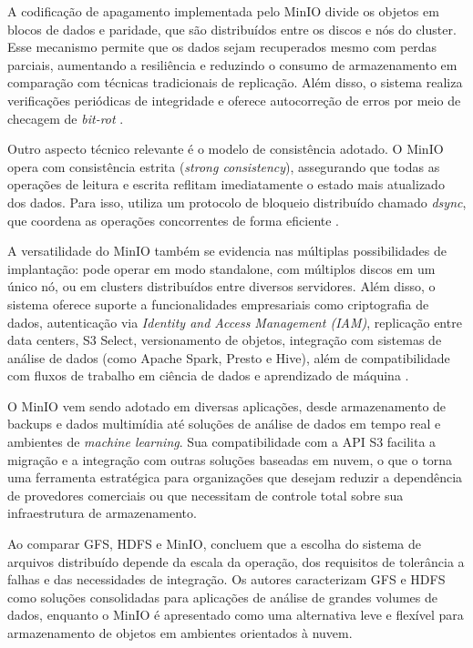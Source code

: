 A codificação de apagamento implementada pelo MinIO divide os objetos em blocos de dados e paridade, que são distribuídos entre os discos e nós do cluster. Esse mecanismo permite que os dados sejam recuperados mesmo com perdas parciais, aumentando a resiliência e reduzindo o consumo de armazenamento em comparação com técnicas tradicionais de replicação. Além disso, o sistema realiza verificações periódicas de integridade e oferece autocorreção de erros por meio de checagem de \textit{bit-rot} \cite{minio_doc}.

Outro aspecto técnico relevante é o modelo de consistência adotado. O MinIO opera com consistência estrita (\textit{strong consistency}), assegurando que todas as operações de leitura e escrita reflitam imediatamente o estado mais atualizado dos dados. Para isso, utiliza um protocolo de bloqueio distribuído chamado \textit{dsync}, que coordena as operações concorrentes de forma eficiente \cite{whitepaper_minio}.

A versatilidade do MinIO também se evidencia nas múltiplas possibilidades de implantação: pode operar em modo standalone, com múltiplos discos em um único nó, ou em clusters distribuídos entre diversos servidores. Além disso, o sistema oferece suporte a funcionalidades empresariais como criptografia de dados, autenticação via \textit{Identity and Access Management (IAM)}, replicação entre data centers, S3 Select, versionamento de objetos, integração com sistemas de análise de dados (como Apache Spark, Presto e Hive), além de compatibilidade com fluxos de trabalho em ciência de dados e aprendizado de máquina \cite{minio_doc, whitepaper_minio}.

O MinIO vem sendo adotado em diversas aplicações, desde armazenamento de backups e dados multimídia até soluções de análise de dados em tempo real e ambientes de \textit{machine learning}. Sua compatibilidade com a API S3 facilita a migração e a integração com outras soluções baseadas em nuvem, o que o torna uma ferramenta estratégica para organizações que desejam reduzir a dependência de provedores comerciais ou que necessitam de controle total sobre sua infraestrutura de armazenamento.

Ao comparar GFS, HDFS e MinIO,  concluem que a escolha do sistema de arquivos distribuído depende da escala da operação, dos requisitos de tolerância a falhas e das necessidades de integração. Os autores caracterizam GFS e HDFS como soluções consolidadas para aplicações de análise de grandes volumes de dados, enquanto o MinIO é apresentado como uma alternativa leve e flexível para armazenamento de objetos em ambientes orientados à nuvem.

